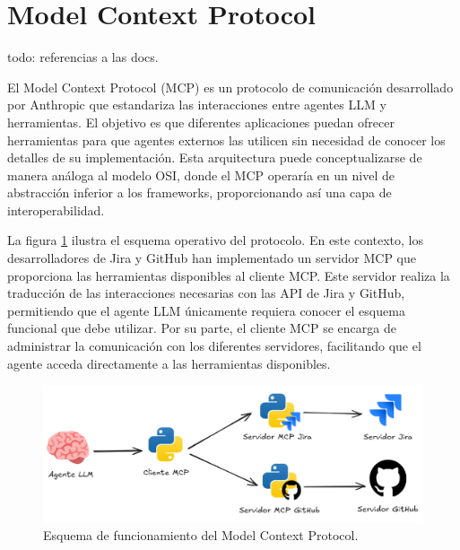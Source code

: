 \section{Model Context Protocol}
todo: referencias a las docs.

El Model Context Protocol (MCP) es un protocolo de comunicación desarrollado por Anthropic que estandariza las interacciones entre agentes LLM y herramientas. El objetivo es que diferentes aplicaciones puedan ofrecer herramientas para que agentes externos las utilicen sin necesidad de conocer los detalles de su implementación. Esta arquitectura puede conceptualizarse de manera análoga al modelo OSI, donde el MCP operaría en un nivel de abstracción inferior a los frameworks, proporcionando así una capa de interoperabilidad.

La figura \ref{fig:mcp} ilustra el esquema operativo del protocolo. En este contexto, los desarrolladores de Jira y GitHub han implementado un servidor MCP que proporciona las herramientas disponibles al cliente MCP. Este servidor realiza la traducción de las interacciones necesarias con las API de Jira y GitHub, permitiendo que el agente LLM únicamente requiera conocer el esquema funcional que debe utilizar. Por su parte, el cliente MCP se encarga de administrar la comunicación con los diferentes servidores, facilitando que el agente acceda directamente a las herramientas disponibles.

\begin{figure}
  \centering
  \includegraphics[width=1\linewidth]{figures/mcp.png}
  \caption{Esquema de funcionamiento del Model Context Protocol.}
  \label{fig:mcp}
\end{figure}


